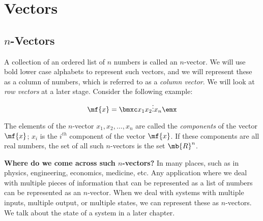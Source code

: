 \chapter{Vectors}\label{chp:vectors}


\section{$n$-Vectors}
A collection of an ordered list of $n$ numbers is called an $n$-vector. We will use bold lower case alphabets to represent such vectors, and we will represent these as a column of numbers, which is referred to as a \textit{column vector}. We will look at \textit{row vectors} at a later stage. Consider the following example:
\[ \mf{x} = \bmxc x_1 \\ x_2 \\ \vdots \\x_n \emx \]

The elements of the $n$-vector $x_1, x_2, \ldots, x_n$ are called the \textit{components} of the vector $\mf{x}$; $x_i$ is the $i^{th}$ component of the vector $\mf{x}$. If these components are all real numbers, the set of all such $n$-vectors is the set $\mb{R}^n$.

\noindent \textbf{Where do we come across such $n$-vectors?} In many places, such as in physics, engineering, economics, medicine, etc. Any application where we deal with multiple pieces of information that can be represented as a list of numbers can be represented as an $n$-vector. When we deal with systems with multiple inputs, multiple output, or multiple states, we can represent these as $n$-vectors. We talk about the state of a system in a later chapter.

